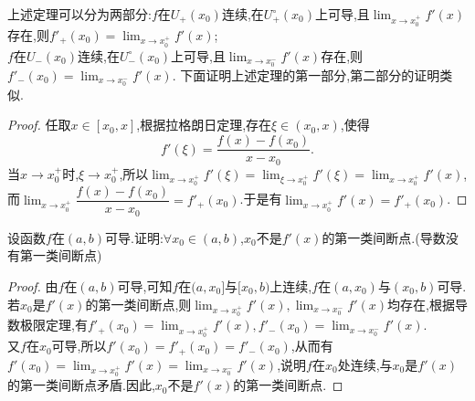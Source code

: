 上述定理可以分为两部分:$f$在$U_{+}(x_0)$连续,在$U^{\circ}_{+}(x_0)$上可导,且$\displaystyle\lim_{x\to x_0^{+}}f'(x)$存在,则$f'_{+}(x_0)=\displaystyle\lim_{x\to x_0^{+}}f'(x)$;\\$f$在$U_{-}(x_0)$连续,在$U^{\circ}_{-}(x_0)$上可导,且$\displaystyle\lim_{x\to x_0^{-}}f'(x)$存在,则$f'_{-}(x_0)=\displaystyle\lim_{x\to x_0^{-}}f'(x)$.
下面证明上述定理的第一部分,第二部分的证明类似.
\begin{proof}
    任取$x\in[x_0,x]$,根据拉格朗日定理,存在$\xi\in(x_0,x)$,使得\[f'(\xi)=\dfrac{f(x)-f(x_0)}{x-x_0}.\]当$x\to x_0^{+}$时,$\xi\to x_0^{+}$,所以$\displaystyle\lim_{x\to x_0^{+}}f'(\xi)=\displaystyle\lim_{\xi\to x_0^{+}}f'(\xi)=\displaystyle\lim_{x\to x_0^{+}}f'(x)$,而$\displaystyle\lim_{x\to x_0^{+}}\dfrac{f(x)-f(x_0)}{x-x_0}=f'_{+}(x_0)$.于是有$\displaystyle\lim_{x\to x_0^{+}}f'(x)=f'_{+}(x_0)$.
\end{proof}
\begin{theorem}
    设函数$f$在$(a,b)$可导.证明:$\forall x_0\in(a,b)$,$x_0$不是$f'(x)$的第一类间断点.(导数没有第一类间断点)
\end{theorem}
\begin{proof}
    由$f$在$(a,b)$可导,可知$f$在$(a,x_0]$与$[x_0,b)$上连续,$f$在$(a,x_0)$与$(x_0,b)$可导.若$x_0$是$f'(x)$的第一类间断点,则$\displaystyle\lim_{x\to x_0^{+}}f'(x),\displaystyle\lim_{x\to x_0^{-}}f'(x)$均存在,根据导数极限定理,有$f'_{+}(x_0)=\displaystyle\lim_{x\to x_0^{+}}f'(x),f'_{-}(x_0)=\displaystyle\lim_{x\to x_0^{-}}f'(x)$.\\又$f$在$x_0$可导,所以$f'(x_0)=f'_{+}(x_0)=f'_{-}(x_0)$,从而有$f'(x_0)=\displaystyle\lim_{x\to x_0^{+}}f'(x)=\displaystyle\lim_{x\to x_0^{-}}f'(x)$,说明$f$在$x_0$处连续,与$x_0$是$f'(x)$的第一类间断点矛盾.因此,$x_0$不是$f'(x)$的第一类间断点.
\end{proof}